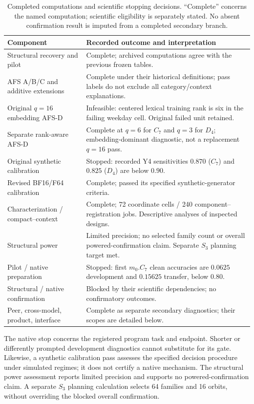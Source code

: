 \begin{table}[t]\centering\small
\caption{Completed computations and scientific stopping decisions. ``Complete'' concerns the named computation; scientific eligibility is separately stated. No absent confirmation result is imputed from a completed secondary branch.}
\label{tab:reproduction-status}
\begin{tabular}{p{}p{}}\toprule
Component & Recorded outcome and interpretation \\\midrule
Structural recovery and pilot & Complete; archived computations agree with the previous frozen tables. \\
AFS A/B/C and additive extensions & Complete under their historical definitions; pass labels do not exclude all category/context explanations. \\
Original $q=16$ embedding AFS-D & Infeasible: centered lexical training rank is six in the failing weekday cell. Original failed unit retained. \\
Separate rank-aware AFS-D & Complete at $q=6$ for $C_7$ and $q=3$ for $D_4$; embedding-dominant diagnostic, not a replacement $q=16$ pass. \\
Original synthetic calibration & Stopped: recorded Y4 sensitivities $0.870$ ($C_7$) and $0.825$ ($D_4$) are below $0.90$. \\
Revised BF16/F64 calibration & Complete; passed its specified synthetic-generator criteria. \\
Characterization / compact--context & Complete; 72 coordinate cells / 240 component--registration jobs. Descriptive analyses of inspected designs. \\
Structural power & Limited precision; no selected family count or overall powered-confirmation claim. Separate $S_3$ planning target met. \\
Pilot / native preparation & Stopped: first $m_0.C_7$ clean accuracies are $0.0625$ development and $0.15625$ transfer, below $0.80$. \\
Structural / native confirmation & Blocked by their scientific dependencies; no confirmatory outcomes. \\
Peer, cross-model, product, interface & Complete as separate secondary diagnostics; their scopes are detailed below. \\
\bottomrule\end{tabular}
\end{table}

The native stop concerns the registered program task and endpoint. Shorter or differently prompted development diagnostics cannot substitute for its gate. Likewise, a synthetic calibration pass assesses the specified decision procedure under simulated regimes; it does not certify a native mechanism. The structural power assessment reports limited precision and supports no powered-confirmation claim. A separate $S_3$ planning calculation selects 64 families and 16 orbits, without overriding the blocked overall confirmation.

